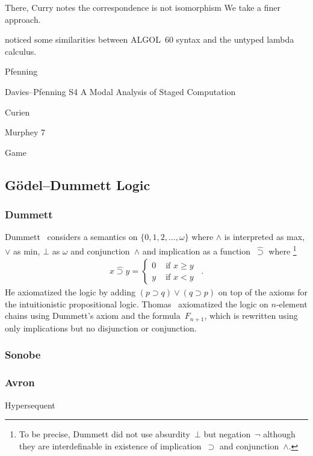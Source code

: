 There, Curry notes the correspondence is not isomorphism  We take a finer approach.

\citet{landin1965} noticed some similarities between ALGOL~60 syntax and
the untyped lambda calculus.

Pfenning

Davies--Pfenning S4 A Modal Analysis of Staged Computation

Curien

Murphey 7

Game


\subsection{G\"odel--Dummett Logic}

\subsubsection{Dummett}
Dummett~\cite{dummett59} considers a semantics on $\{0,1,2,\ldots,\omega\}$ where
$\wedge$ is interpreted as max, $\vee$ as min, $\bot$ as $\omega$
and conjunction~$\wedge$
 and implication as a
function~$\hat\supset$ where%
\footnote{To be precise, Dummett did not use absurdity~$\bot$ but negation~$\neg$
although they are interdefinable in existence of implication~$\supset$
and conjunction~$\wedge$.}
\begin{align*}
 x \hat\supset y= \begin{cases}
		    0 &\text{ if } x\ge y \\
		    y &\text{ if } x < y
		  \end{cases}\enspace.
\end{align*}
He axiomatized the logic by adding $(p\supset q)\lor(q\supset p)$ on top
of the axioms for the intuitionistic propositional logic.
Thomas~\citep{thomas1962} axiomatized
 the logic on $n$-element chains using Dummett's axiom and the
 formula~$F_{n+1}$,
 which is rewritten using only implications but no disjunction or conjunction.

\subsubsection{Sonobe}

\subsubsection{Avron}
Hypersequent


